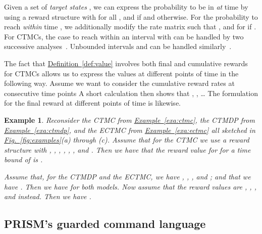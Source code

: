 \documentclass[10pt,twocolumn]{article}
\newtheorem{example}{Example}
\newcommand{\refdef}[1]{\texorpdfstring{\hyperref[def:#1]{Definition~\ref*{def:#1}}}{Definition \ref*{def:#1}}}
\newcommand{\reffig}[1]{\texorpdfstring{\hyperref[fig:#1]{Fig.~\ref*{fig:#1}}}{Fig.~\ref*{fig:#1}}}
\newcommand{\refexa}[1]{\texorpdfstring{\hyperref[exa:#1]{Example~\ref*{exa:#1}}}{Example~\ref*{exa:#1}}}
\begin{document}
Given a set of \emph{target states} , we can express the probability
to be in  \emph{at} time  by using a reward structure with 
for all , and  if 
and  otherwise. For the probability to reach  \emph{within}
time , we additionally modify the rate matrix  such that ,
and  for  if .
For CTMCs, the case to reach  within an interval  with  can
be handled by two successive analyses~\cite[Theorem 3]{BaierHHK03}. Unbounded intervals
 and  can be handled similarly~\cite[Section 4.4]{KwiatkowskaNP07}.

The fact that \refdef{value} involves both final and cumulative rewards for CTMCs allows us to express the values at different points of time in the following way.
Assume we want to consider the cumulative reward rates  at consecutive time points 
A short calculation then shows that , , \dots{}
The formulation for the final reward at different points of time is likewise.

\begin{example}
  \label{exa:values}
Reconsider the CTMC from \refexa{ctmc}, the CTMDP from \refexa{ctmdp}, and the ECTMC from \refexa{ectmc} all sketched in \reffig{examples}(a) through (c).
  Assume that for the CTMC we use a reward structure  with
  , , , , ,
  , and .
  Then we have that the reward value for  for a time bound of  is .

  Assume that, for the CTMDP and the ECTMC, we have , , , and ;
  and that we have . Then we have  for both models.
  Now assume that the reward values are , , , and  instead.
  Then we have .
\end{example}



\subsection{PRISM's guarded command language}
\label{subsec:prism_gcl}
\end{document}
